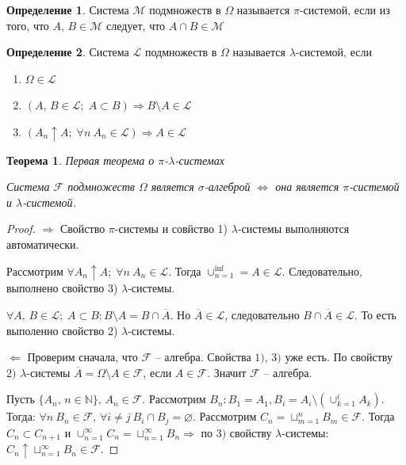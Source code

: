 \documentclass[a4paper,12pt]{article}
\renewcommand{\emptyset}{\ensuremath{\varnothing}}
\theoremstyle{plain}
\newtheorem{theorem}{Теорема}[section]
\theoremstyle{definition}
\newtheorem{definition}{Определение}[section]
\theoremstyle{remark}
\begin{document}
\begin{definition}
	Система $\mathcal{M}$ подмножеств в $\Omega$ называется $\pi$-системой, если из того, что $A,\, B \in \mathcal{M}$ следует, что $A \cap B \in \mathcal{M}$
\end{definition}

\begin{definition}
	Система $\mathcal{L}$ подмножеств в $\Omega$ называется $\lambda$-системой, если
	\begin{enumerate}
		\item $\Omega \in \mathcal{L}$
		\item $(A,\, B \in \mathcal{L};\; A \subset B) \Rightarrow B \setminus A \in \mathcal{L}$
		\item $(A_n \uparrow A;\; \forall n \: A_n \in \mathcal{L}) \Rightarrow A \in \mathcal{L}$
	\end{enumerate}
\end{definition}

\begin{theorem} \label{FIRST_SYSTEM_TH}
	Первая теорема о $\pi$-$\lambda$-системах

	Система $\mathcal{F}$ подмножеств $\Omega$ является $\sigma$-алгеброй $\Leftrightarrow$ она является $\pi$-системой и $\lambda$-системой.
\end{theorem}

\begin{proof}
	$\Rightarrow$ Свойство $\pi$-системы и совйство 1) $\lambda$-системы выполняются автоматически.

	Рассмотрим $\forall A_n \uparrow A;\; \forall n \: A_n \in \mathcal{L}$. Тогда $\cup_{n = 1}^{\inf} = A \in \mathcal{L}$. Следовательно, выполнено свойство 3) $\lambda$-системы.

	$\forall A,\, B \in \mathcal{L};\; A \subset B : B \setminus A = B \cap \overline{A}$. Но $\overline{A} \in \mathcal{L}$, следовательно $B \cap \overline{A} \in \mathcal{L}$.
	То есть выполенно свойство 2) $\lambda$-системы.

	$\Leftarrow$ Проверим сначала, что $\mathcal{F}$ -- алгебра. Свойства $1),\,3)$ уже есть. По свойству $2)$ $\lambda$-системы $\overline{A} = \Omega \setminus A \in \mathcal{F}$, если $A \in \mathcal{F}$. Значит $\mathcal{F}$ -- алгебра.

	Пусть $\{A_n,\, n \in \mathbb{N}\},\, A_n \in \mathcal{F}$. Рассмотрим $B_n : B_1 = A_1, B_i = A_i \setminus \left(\cup_{k = 1}^{i} A_k\right)$. Тогда: $\forall n \: B_n \in \mathcal{F},\, \forall i \neq j \: B_i \cap B_j = \emptyset$. Рассмотрим $C_n = \sqcup_{m = 1}^n B_m \in \mathcal{F}$. Тогда $C_n \subset C_{n + 1}$ и $\cup_{n = 1}^\infty C_n = \sqcup_{n = 1}^\infty B_n \Rightarrow$ по $3)$ свойству $\lambda$-системы: $C_n \uparrow \sqcup_{n = 1}^\infty B_n \in \mathcal{F}$.
\end{proof}
\end{document}
